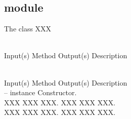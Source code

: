 %
%
%
%
%

\subsection{module}
\label{sec:module}

The  class XXX

\begin{longtable}{}
\caption{module summary}
\\
\hline
\optableent
	{Input(s)}
	{Method}
	{Output(s)}
	{Description}
\hline \hline
\endfirsthead
\caption[]{\emph{continued}} \\
\hline
\optableent
	{Input(s)}
	{Method}
	{Output(s)}
	{Description}
\hline \hline \endhead
{} \endfoot
\hline \endlastfoot
 \\
\hline \hline
\optableent
	{--}
	{{\bf {}}}
	{instance}
	{Constructor.}
\hline \hline
{} \\
\hline \hline
\optableent
	{XXX}
	{{\bf {}}}
	{XXX}
	{XXX.}
\hline
\optableent
	{XXX}
	{{\bf {}}}
	{XXX}
	{XXX.}
\hline \hline
{} \\
\hline \hline
\optableent
	{XXX}
	{{\bf {}}}
	{XXX}
	{XXX.}
\hline
\optableent
	{XXX}
	{{\bf {}}}
	{XXX}
	{XXX.}
\end{longtable}

